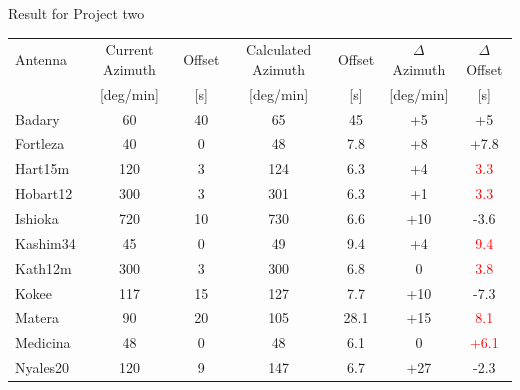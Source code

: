 \documentclass{beamer}
\begin{document}
    \begin{frame}{Result for Project two}
        \begin{tabular}{l | c c | c c |c c}
            Antenna & Current Azimuth & Offset & Calculated Azimuth & Offset & $\Delta$Azimuth & $\Delta$Offset \\ [-8pt]
                    & \tiny{[deg/min]}& \tiny{[s]}&\tiny{[deg/min]}&\tiny{[s]}&\tiny{[deg/min]}& \tiny{[s]} \\ 
            \hline
            Badary            & 60  & 40 & 65 & 45  & +5 & +5  \\
            Fortleza          & 40  &  0 & 48 & 7.8 & +8 & +7.8 \\
            Hart15m           & 120 & 3  & 124& 6.3 & +4 &\textcolor{red}{3.3}   \\
            Hobart12          & 300 & 3  & 301&6.3  & +1 &\textcolor{red}{3.3}   \\
            Ishioka           & 720 & 10 & 730& 6.6 &+10 & -3.6    \\
            Kashim34          & 45  & 0  & 49 &9.4  &+4  & \textcolor{red}{9.4}  \\
            Kath12m           & 300 & 3  & 300& 6.8 &0   &\textcolor{red}{3.8}   \\
            Kokee             & 117 & 15 & 127& 7.7 &+10 & -7.3   \\
            Matera            & 90  &20  &105 &28.1 &+15 & \textcolor{red}{8.1}  \\
            Medicina          &  48 &0   &48  &6.1  &0   &\textcolor{red}{+6.1}  \\
            Nyales20          & 120 &9   &147 & 6.7 & +27&-2.3   \\
        \end{tabular}
    \end{frame}
\end{document}
